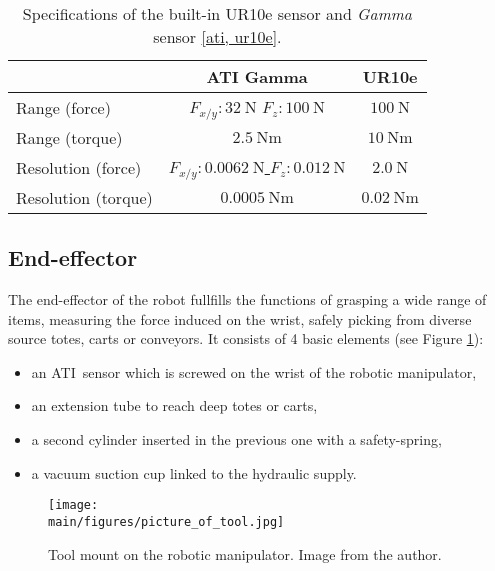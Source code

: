 \documentclass[/home/francois/latex/report/main.tex]{subfiles}
\begin{document}
\begin{table}[h!]
  \begin{center}
    \caption{Specifications of the built-in UR10e sensor and \textit{Gamma} sensor \ref{ati, ur10e}. }
    \label{tab:background:ft-sensor}
    \renewcommand{\arraystretch}{1.8} %
    \begin{tabular}{l|c|c} %
      & \textbf{ATI Gamma} & \textbf{UR10e}\\
      \hline
      Range (force)  & $F_{x/y}: 32 \ \si{\newton}$ $F_z: 100 \ \si{\newton}$ & \underline{$100 \ \si{\newton}$} \\
      \hline
      Range (torque)  & $2.5 \ \si{\newton} \si{\meter}$ & \underline{$10 \ \si{\newton} \si{\meter}$} \\
      \hline
      Resolution (force)  & \underline{$F_{x/y}: 0.0062 \ \si{\newton}$ $F_z: 0.012 \ \si{\newton}$} & $2.0 \ \si{\newton}$ \\
      \hline
      Resolution (torque)  & \underline{$0.0005 \ \si{\newton} \si{\meter}$} & $0.02 \ \si{\newton} \si{\meter}$ \\
      \hline
    \end{tabular}
  \end{center}
\end{table}

\subsection{End-effector}

The end-effector of the robot fullfills the functions of grasping a wide range of items, measuring the force induced on the wrist, safely picking from diverse source totes, carts or conveyors. It consists of 4 basic elements (see Figure \ref{fig:background:tool}):

\begin{itemize}
  \item an ATI\texttrademark \ sensor which is screwed on the wrist of the robotic manipulator,
  \item an extension tube to reach deep totes or carts,
  \item a second cylinder inserted in the previous one with a safety-spring,
  \item a vacuum suction cup linked to the hydraulic supply.
\end{itemize}

\begin{figure}[H]
  \centering
  \texttt{[image: \\main/figures/picture\_of\_tool.jpg]}
  \caption{Tool mount on the robotic manipulator. Image from the author.}
  \label{fig:background:tool}
\end{figure}
\end{document}
